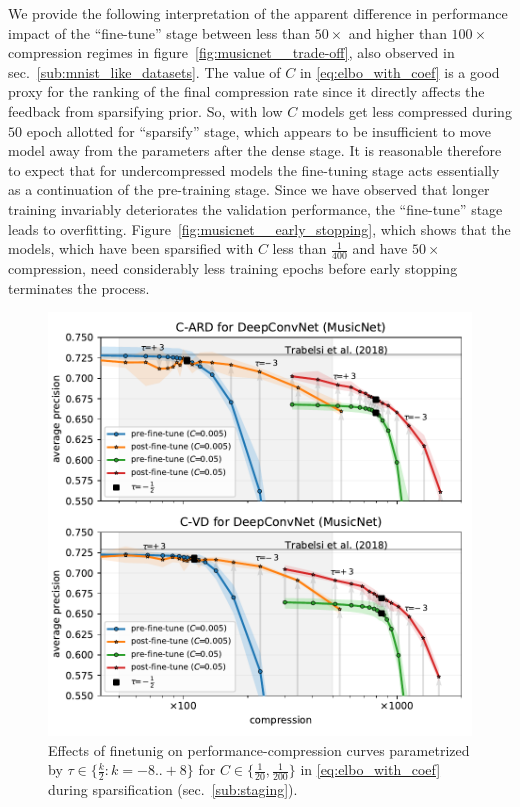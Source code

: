 \documentclass[a4paper,10pt,onecolumn]{article}
\begin{document}
We provide the following interpretation of the apparent difference in performance impact
of the ``fine-tune'' stage between less than $50\times$ and higher than $100\times$ compression
regimes in figure~\ref{fig:musicnet__trade-off}, also observed in sec.~\ref{sub:mnist_like_datasets}.
%
The value of $C$ in \eqref{eq:elbo_with_coef} is a good proxy for the ranking of the final
compression rate since it directly affects the feedback from sparsifying prior. So, with
low $C$ models get less compressed during $50$ epoch allotted for ``sparsify'' stage, which
appears to be insufficient to move model away from the parameters after the dense stage.
It is reasonable therefore to expect that for undercompressed models the fine-tuning stage
acts essentially as a continuation of the pre-training stage. Since we have observed that
longer training invariably deteriorates the validation performance, the ``fine-tune'' stage
leads to overfitting. Figure~\ref{fig:musicnet__early_stopping}, which shows that the models,
which have been sparsified with $C$ less than $\tfrac1{400}$ and have $50\times$ compression,
need considerably less training epochs before early stopping terminates the process.

\begin{figure}[!t]
  \centering
  \includegraphics[width=1\columnwidth]{figure__musicnet__threshold__C__DeepConvNet.pdf}
  \caption{%
    Effects of finetunig on performance-compression curves parametrized by $
      \tau\in \{\tfrac{k}2\colon k=-8..+8 \}
    $ for $
      C\in \{\tfrac1{20}, \frac1{200}\}
    $ in \eqref{eq:elbo_with_coef} during sparsification (sec.~\ref{sub:staging}).
  }
  \label{fig:hist__and__threshold__tradeoff}
\end{figure}
\end{document}
